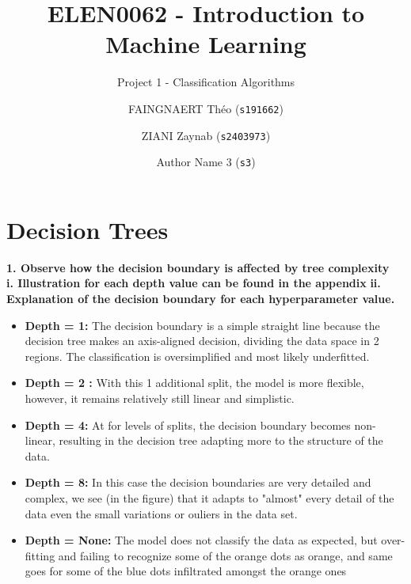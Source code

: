 \documentclass[acmconf,nonacm=true]{acmart}
\begin{document}
\title{ELEN0062 - Introduction to Machine Learning}
\subtitle{Project 1 - Classification Algorithms}

\author{FAINGNAERT Théo (\texttt{s191662})}
\author{ZIANI Zaynab (\texttt{s2403973})}
\author{Author Name 3 (\texttt{s3})}

\maketitle

\section{Decision Trees}


\textbf{1. Observe how the decision boundary is affected by tree complexity}\\
\textbf{i. Illustration for each depth value can be found in the appendix}
\newline
    \textbf{ii. Explanation of the decision boundary for each hyperparameter value.}
    \begin{itemize}
        \item \textbf{Depth = 1: }The decision boundary is a simple straight line because the decision tree makes an axis-aligned decision, dividing the data space in 2 regions. The classification is oversimplified and most likely underfitted.
    \end{itemize}
    \begin{itemize}
        \item \textbf{Depth = 2 :}  With this 1 additional split, the model is more flexible, however, it remains relatively still linear and simplistic.
    \end{itemize}
   \begin{itemize}
       \item \textbf{ Depth = 4: }At for levels of splits, the decision boundary becomes non-linear, resulting in the decision tree adapting more to the structure of the data.
   \end{itemize}
   \begin{itemize}
       \item \textbf{Depth = 8: } In this case the decision boundaries are very detailed and complex, we see (in the figure) that it adapts to "almost" every detail of the data even the small variations or ouliers in the data set.
       \item \textbf{Depth = None: } The model does not classify the data as expected, but over-fitting and failing to recognize some of the orange dots as orange, and same goes for some of the blue dots infiltrated amongst the orange ones
    \end{itemize}
\end{document}
